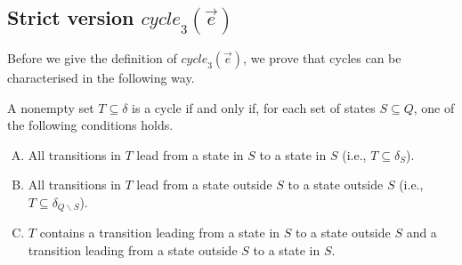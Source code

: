 \documentclass[a4paper,UKenglish,cleveref,autoref,thm-restate]{lipics-v2021}
\newcommand{\mcycle}{\mathit{cycle}}
\begin{document}
\subsection{Strict version $\mcycle_3(\vec{e})$}
Before we give the definition of $\mcycle_3(\vec{e})$, we prove that
cycles can be characterised in the following way.
\begin{lemma}
  A nonempty set $T\subseteq\delta$ is a cycle if and only if, for each
  set of states $S\subseteq Q$, one of the following conditions holds.
  \begin{enumerate}[A.]
  \item\label{en:1} All transitions in $T$ lead from a state in $S$ to a state in $S$ (i.e., $T\subseteq\delta_S$).
  \item\label{en:2} All transitions in $T$ lead from a state outside $S$ to a state outside $S$ (i.e., $T\subseteq\delta_{Q\smallsetminus S}$).
  \item\label{en:3} $T$ contains a transition leading from a state in $S$ to a state outside $S$ and a transition leading from a state outside
    $S$ to a state in $S$.
  \end{enumerate}
\end{lemma}
\end{document}
